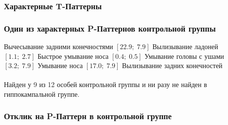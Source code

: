 \documentclass[smaller]{beamer}
\begin{document}
\begin{frame}
  \frametitle{Характерные T-Паттерны}
\begin{figure}[h]
\noindent{}
\end{figure}
\end{frame}

\begin{frame}
  \frametitle{Один из характерных P-Паттернов контрольной группы}
 Вычесывание задними конечностями $[22.9;\; 7.9]$
 Вылизывание ладоней $[1.1;\; 2.7]$
 Быстрое умывание носа $[0.4;\; 0.5]$
 Умывание головы с ушами $[ 3.2;\; 7.9 ]$
 Умывание носа $[ 17.0;\; 7.9 ]$
 Вылизывание задних конечностей
 \\ ~\\


 Найден у 9 из 12 особей контрольной группы и ни разу не найден в гиппокампальной группе.
\end{frame}

\begin{frame}
  \frametitle{Отклик на P-Паттерн в контрольной группе}
\begin{figure}[h]
\noindent{}
\end{figure}
\end{frame}
\end{document}
